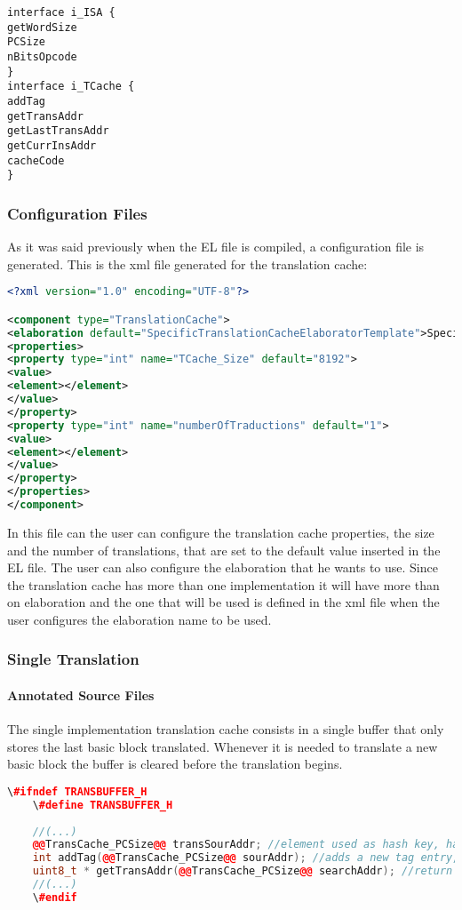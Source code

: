 \begin{lstlisting}[caption={Translation Cache Interfaces EL file}, label={lst:TCacheInterfaces}, language=EL]
interface i_ISA {
getWordSize
PCSize
nBitsOpcode
}
interface i_TCache {
addTag 				
getTransAddr		
getLastTransAddr 	
getCurrInsAddr	
cacheCode			
}
\end{lstlisting}



\subsubsection{Configuration Files}
As it was said previously when the EL file is compiled, a configuration file is generated. This is the xml file generated for the translation cache:
\begin{lstlisting}[caption={Translation Cache xml file}, label={lst:TCachexml},language=xml]
<?xml version="1.0" encoding="UTF-8"?>

<component type="TranslationCache">
<elaboration default="SpecificTranslationCacheElaboratorTemplate">SpecificTranslationCacheElaborator</elaboration>
<properties>
<property type="int" name="TCache_Size" default="8192">
<value>
<element></element>
</value>
</property>
<property type="int" name="numberOfTraductions" default="1">
<value>
<element></element>
</value>
</property>
</properties>
</component>
\end{lstlisting}
In this file can the user can configure the translation cache properties, the size and the number of translations, that are set to the default value inserted in the EL file. The user can also configure the elaboration that he wants to use. Since the translation cache has more than one implementation it will have more than on elaboration and the one that will be used is defined in the xml file when the user configures the elaboration name to be used.


\subsubsection{Single Translation}


	\paragraph{Annotated Source Files}
	The single implementation translation cache consists in a single buffer that only stores the last basic block translated. Whenever it is needed to translate a new basic block the buffer is cleared before the translation begins.
	\begin{lstlisting}[caption={Annotations for single translation TransBuffer.h}, label={lst:annotSingleTcache.h},language=C++]
	\#ifndef TRANSBUFFER_H
	\#define TRANSBUFFER_H
	
	//(...)
	@@TransCache_PCSize@@ transSourAddr; //element used as hash key, has the source code memory address of the BB
	int addTag(@@TransCache_PCSize@@ sourAddr);	//adds a new tag entry, marking the begining of a new translated BB
	uint8_t * getTransAddr(@@TransCache_PCSize@@ searchAddr); //return the address of the code or NULL if the entry exists or not
	//(...)
	\#endif
	
	\end{lstlisting}
	
